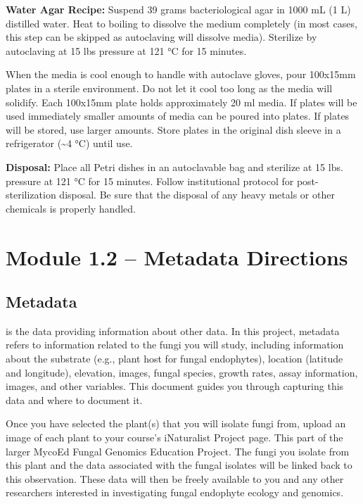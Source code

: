 \documentclass[
  letterpaper,
  DIV=11,
  numbers=noendperiod]{scrreprt}
\providecommand{\tightlist}{%
  \setlength{\itemsep}{0pt}\setlength{\parskip}{0pt}}
\begin{document}
\textbf{Water Agar Recipe:} Suspend 39 grams bacteriological agar in
1000 mL (1 L) distilled water. Heat to boiling to dissolve the medium
completely (in most cases, this step can be skipped as autoclaving will
dissolve media). Sterilize by autoclaving at 15 lbs pressure at 121 °C
for 15 minutes.

When the media is cool enough to handle with autoclave gloves, pour
100x15mm plates in a sterile environment. Do not let it cool too long as
the media will solidify. Each 100x15mm plate holds approximately 20 ml
media. If plates will be used immediately smaller amounts of media can
be poured into plates. If plates will be stored, use larger amounts.
Store plates in the original dish sleeve in a refrigerator
(\textasciitilde4 °C) until use.

\textbf{Disposal:} Place all Petri dishes in an autoclavable bag and
sterilize at 15 lbs. pressure at 121 °C for 15 minutes. Follow
institutional protocol for post-sterilization disposal. Be sure that the
disposal of any heavy metals or other chemicals is properly handled.

\section*{Module 1.2 -- Metadata
Directions}\label{module-1.2-metadata-directions}


\subsection*{Metadata}\label{metadata}

\begin{description}
\tightlist
\item[Metadata]
is the data providing information about other data. In this project,
metadata refers to information related to the fungi you will study,
including information about the substrate (e.g., plant host for fungal
endophytes), location (latitude and longitude), elevation, images,
fungal species, growth rates, assay information, images, and other
variables. This document guides you through capturing this data and
where to document it.
\end{description}

Once you have selected the plant(s) that you will isolate fungi from,
upload an image of each plant to your course's iNaturalist Project page.
This part of the larger MycoEd Fungal Genomics Education Project. The
fungi you isolate from this plant and the data associated with the
fungal isolates will be linked back to this observation. These data will
then be freely available to you and any other researchers interested in
investigating fungal endophyte ecology and genomics.
\end{document}
